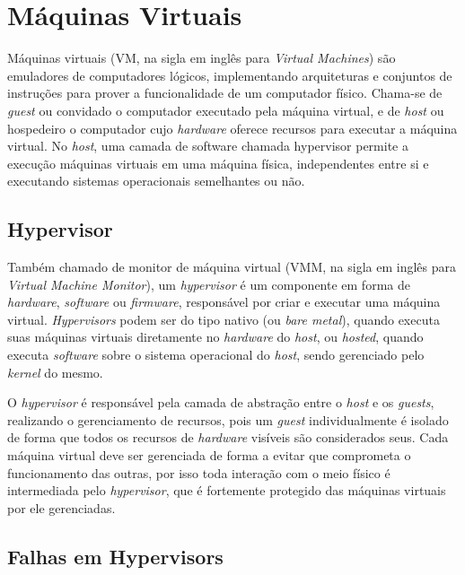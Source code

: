 \documentclass{report}
\title{\todo{A gente descobre depois}}
\author{João Gabriel Trombeta\\
        João Paulo Taylor Ienczak Zanette\\
        Ranieri Schroeder Althoff}
\date{\today}
\begin{document}
\maketitle

\tableofcontents

\chapter{Máquinas Virtuais}

Máquinas virtuais (VM, na sigla em inglês para \textit{Virtual Machines}) são
emuladores de computadores lógicos, implementando arquiteturas e conjuntos de
instruções para prover a funcionalidade de um computador físico. Chama-se de
\textit{guest} ou convidado o computador executado pela máquina virtual, e de
\textit{host} ou hospedeiro o computador cujo \textit{hardware} oferece
recursos para executar a máquina virtual. No \textit{host}, uma camada de
software chamada hypervisor permite a execução máquinas virtuais em uma máquina
física, independentes entre si e executando sistemas operacionais semelhantes
ou não.

\section{Hypervisor}

Também chamado de monitor de máquina virtual (VMM, na sigla em inglês para
\textit{Virtual Machine Monitor}), um \textit{hypervisor} é um componente em
forma de \textit{hardware}, \textit{software} ou \textit{firmware}, responsável
por criar e executar uma máquina virtual. \textit{Hypervisors} podem ser do
tipo nativo (ou \textit{bare metal}), quando executa suas máquinas virtuais
diretamente no \textit{hardware} do \textit{host}, ou \textit{hosted}, quando
executa \textit{software} sobre o sistema operacional do \textit{host}, sendo
gerenciado pelo \textit{kernel} do mesmo.

O \textit{hypervisor} é responsável pela camada de abstração entre o
\textit{host} e os \textit{guests}, realizando o gerenciamento de recursos,
pois um \textit{guest} individualmente é isolado de forma que todos os recursos
de \textit{hardware} visíveis são considerados seus. Cada máquina virtual deve
ser gerenciada de forma a evitar que comprometa o funcionamento das outras, por
isso toda interação com o meio físico é intermediada pelo \textit{hypervisor},
que é fortemente protegido das máquinas virtuais por ele gerenciadas.

\section{Falhas em Hypervisors}
\end{document}
